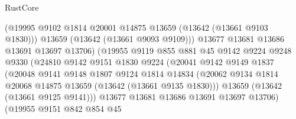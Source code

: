 \begin{lexlean}{RustCore}
\begin{coremodule}
                                  (@19995
                                    @9102
                                    @1814
                                    @20001
                                    @14875
                                    @13659
                                    (@13642 (@13661 @9103 @1830)))
                                  @13659
                                  (@13642 (@13661 @9093 @9109)))
                                @13677
                                @13681
                                @13686
                                @13691
                                @13697
                                @13706)
                              (@19955
                                @9119
                                @855
                                @881
                                @45
                                @9142
                                @9224
                                @9248
                                @9330
                                (@24810
                                  @9142
                                  @9151
                                  @1830
                                  @9224
                                  (@20041
                                    @9142
                                    @9149
                                    @1837
                                    (@20048
                                      @9141
                                      @9148
                                      @1807
                                      @9124
                                      @1814
                                      @14834
                                      (@20062
                                        @9134
                                        @1814
                                        @20068
                                        @14875
                                        @13659
                                        (@13642 (@13661 @9135 @1830)))
                                      @13659
                                      (@13642 (@13661 @9125 @9141)))
                                    @13677
                                    @13681
                                    @13686
                                    @13691
                                    @13697
                                    @13706)
                                  (@19955
                                    @9151
                                    @842
                                    @854
                                    @45

\end{coremodule}
\end{lexlean}
